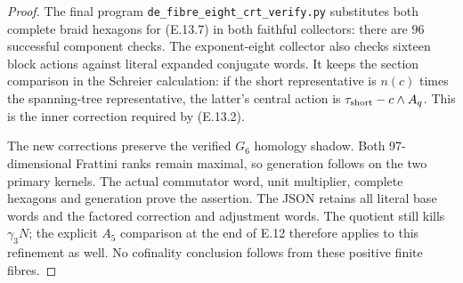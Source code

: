 \begin{proof}
The final program \texttt{de\_fibre\_eight\_crt\_verify.py}
substitutes both complete braid hexagons for (E.13.7) in
both faithful collectors: there are $96$ successful
component checks. The exponent-eight collector also checks
sixteen block actions against literal expanded conjugate
words. It keeps the section comparison in the Schreier
calculation: if the short representative is $n(c)$ times
the spanning-tree representative, the latter's central
action is $\tau_{\rm short}-c\wedge A_q$. This is the
inner correction required by (E.13.2).

The new corrections preserve the verified $G_6$ homology
shadow. Both 97-dimensional Frattini ranks remain maximal,
so generation follows on the two primary kernels. The
actual commutator word, unit multiplier, complete hexagons
and generation prove the assertion. The JSON retains all
literal base words and the factored correction and adjustment
words. The quotient still kills $\gamma_3N$; the explicit
$A_5$ comparison at the end of E.12 therefore applies to
this refinement as well. No cofinality conclusion follows
from these positive finite fibres.
\end{proof}


